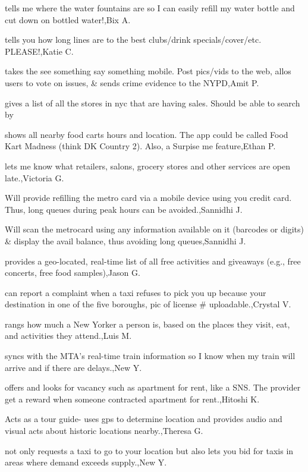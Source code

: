 \documentclass{article}
\begin{document}
tells me where the water fountains are so I can easily refill my water bottle and cut down on bottled water!,Bix A.

tells you how long lines are to the best clubs/drink specials/cover/etc. PLEASE!,Katie C.

takes the see something say something mobile. Post pics/vids to the web, allos users to vote on issues, \& sends crime evidence to the NYPD,Amit P.

gives a list of all the stores in nyc that are having sales.  Should be able to search by %

shows all nearby food carts hours and location. The app could be called Food Kart Madness (think DK Country 2). Also, a Surpise me feature,Ethan P.

lets me know what retailers, salons, grocery stores and other services are open late.,Victoria G.

Will provide refilling the metro card via a mobile device using you credit card. Thus, long queues during peak hours can be avoided.,Sannidhi J.

Will scan the metrocard using any information available on it (barcodes or digits) \& display the avail balance, thus avoiding long queues,Sannidhi J.

provides a geo-located, real-time list of all free activities and giveaways (e.g., free concerts, free food samples),Jason G.

can report a complaint when a taxi refuses to pick you up because your destination in one of the five boroughs, pic of license \# uploadable.,Crystal  V.

 rangs how much a New Yorker a person is, based on the places they visit, eat, and activities they attend.,Luis M.

syncs with the MTA's real-time train information so I know when my train will arrive and if there are delays.,New Y.

offers and looks for vacancy such as apartment for rent, like a SNS. The provider get a reward when someone contracted apartment for rent.,Hitoshi K.

Acts as a tour guide- uses gps to determine location and provides audio and visual acts about historic locations nearby.,Theresa G.

not only requests a taxi to go to your location but also lets you bid for taxis in areas where demand exceeds supply.,New Y.
\end{document}
